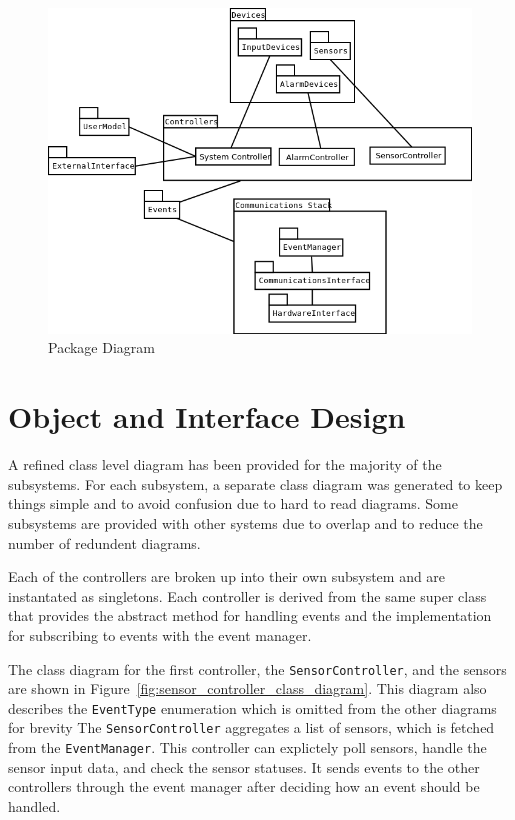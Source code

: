 \documentclass{report}
\begin{document}
\begin{figure}
    \caption{Package Diagram}
    \label{fig:package_diagram}
    \includegraphics[scale=0.5]{package_diagram.png}
\end{figure}

\section{Object and Interface Design}
A refined class level diagram has been provided for the majority of the
subsystems. For each subsystem, a separate class diagram was generated to keep
things simple and to avoid confusion due to hard to read diagrams. Some
subsystems are provided with other systems due to overlap and to reduce the
number of redundent diagrams.

Each of the controllers are broken up into their own subsystem and are
instantated as singletons. Each controller is derived from the same super class
that provides the abstract method for handling events and the
implementation for subscribing to events with the event manager.

The class diagram for the first controller, the \texttt{SensorController}, and
the sensors are shown in Figure~\ref{fig:sensor_controller_class_diagram}. This
diagram also describes the \texttt{EventType} enumeration which is omitted from
the other diagrams for brevity The \texttt{SensorController} aggregates a list
of sensors, which is fetched from the \texttt{EventManager}. This controller can
explictely poll sensors, handle the sensor input data, and check the sensor
statuses. It sends events to the other controllers through the event manager
after deciding how an event should be handled. 
\end{document}
